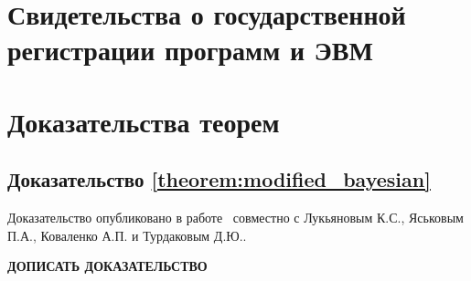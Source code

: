 \chapter{Свидетельства о государственной регистрации программ и ЭВМ}\label{app:A}






\chapter{Доказательства теорем}\label{app:B}

\section{Доказательство \cref{theorem:modified_bayesian}}\label{app:B1}

Доказательство опубликовано в работе~\cite{lukyanov2024extrapolation} совместно с Лукьяновым К.С., Яськовым П.А., Коваленко А.П. и Турдаковым Д.Ю..

\textbf{ДОПИСАТЬ ДОКАЗАТЕЛЬСТВО}

